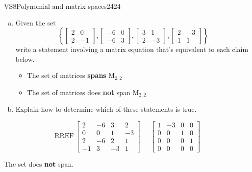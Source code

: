 \begin{exercise}{VS8}{Polynomial and matrix spaces}{2424} 
\begin{exerciseStatement} 

\begin{enumerate}[(a)]
\item  

 Given the set \[\left\{ \left[\begin{array}{cc}
2 & 0 \\
2 & -1
\end{array}\right] , \left[\begin{array}{cc}
-6 & 0 \\
-6 & 3
\end{array}\right] , \left[\begin{array}{cc}
3 & 1 \\
2 & -3
\end{array}\right] , \left[\begin{array}{cc}
2 & -3 \\
1 & 1
\end{array}\right] \right\}\] write a statement involving a matrix equation that's equivalent to each claim below. 

 

\begin{itemize}
\item  

 The set of matrices \textbf{spans} \(\mathrm{M}_{2,2}\) 

 
\item  

 The set of matrices does \textbf{not} span \(\mathrm{M}_{2,2}\) 

 
\end{itemize}

     
\item  

 Explain how to determine which of these statements is true. 

 
\end{enumerate}

     \end{exerciseStatement}
 \begin{exerciseAnswer} 

 \[
\mathrm{RREF}\, \left[\begin{array}{cccc}
2 & -6 & 3 & 2 \\
0 & 0 & 1 & -3 \\
2 & -6 & 2 & 1 \\
-1 & 3 & -3 & 1
\end{array}\right] = \left[\begin{array}{cccc}
1 & -3 & 0 & 0 \\
0 & 0 & 1 & 0 \\
0 & 0 & 0 & 1 \\
0 & 0 & 0 & 0
\end{array}\right]
            \] 

 

 The set does \textbf{not} span. 

 \end{exerciseAnswer}
 \end{exercise}


